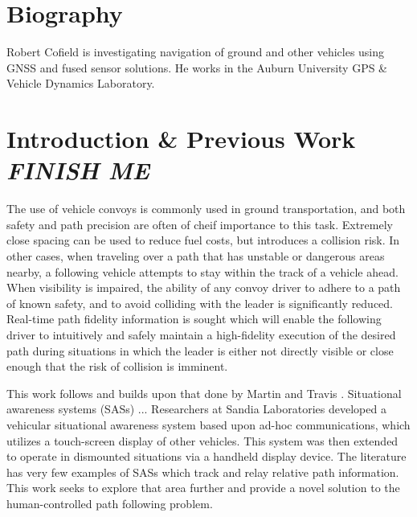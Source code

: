 \documentclass[twocolumn,10pt]{article}
\begin{document}

\section*{Biography}

  Robert Cofield is investigating navigation of ground and other vehicles using GNSS and fused sensor solutions.  He works in the Auburn University GPS \& Vehicle Dynamics Laboratory.


\section*{Introduction \& Previous Work \\ \textit{FINISH ME}}

  The use of vehicle convoys is commonly used in ground transportation, and both safety and path precision are often of cheif importance to this task.  Extremely close spacing can be used to reduce fuel costs, but introduces a collision risk.  In other cases, when traveling over a path that has unstable or dangerous areas nearby, a following vehicle attempts to stay within the track of a vehicle ahead.  When visibility is impaired, the ability of any convoy driver to adhere to a path of known safety, and to avoid colliding with the leader is significantly reduced.  Real-time path fidelity information is sought which will enable the following driver to intuitively and safely maintain a high-fidelity execution of the desired path during situations in which the leader is either not directly visible or close enough that the risk of collision is imminent.

  This work follows and builds upon that done by Martin \cite{ScottThesis} and Travis \cite{travisdiss}.  
  Situational awareness systems (SASs) ... 
  Researchers at Sandia Laboratories \cite{riblett2007} developed a vehicular situational awareness system based upon ad-hoc communications, which utilizes a touch-screen display of other vehicles. This system was then extended to operate in dismounted situations via a handheld display device.
  The literature has very few examples of SASs which track and relay relative path information. This work seeks to explore that area further and provide a novel solution to the human-controlled path following problem.
\end{document}
